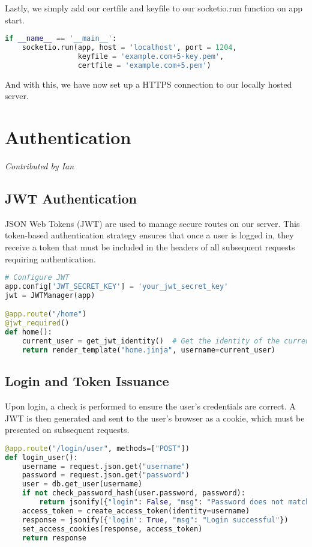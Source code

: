 \documentclass{article}
\begin{document}
Lastly, we simply add our certfile and keyfile to our socketio.run function on app start.
\begin{lstlisting}[language=Python]
if __name__ == '__main__':
    socketio.run(app, host = 'localhost', port = 1204,
                 keyfile = 'example.com+5-key.pem',
                 certfile = 'example.com+5.pem')
\end{lstlisting}

And with this, we have now set up a HTTPS connection to our locally hosted server.

\section{Authentication}
\textit{Contributed by Ian}

\subsection*{JWT Authentication}
JSON Web Tokens (JWT) are used to manage secure routes on our server. This token-based authentication strategy ensures that once a user is logged in, they receive a token that must be included in the headers of all subsequent requests requiring authentication.

\begin{lstlisting}[language=Python]
# Configure JWT
app.config['JWT_SECRET_KEY'] = 'your_jwt_secret_key'
jwt = JWTManager(app) 

@app.route("/home")
@jwt_required()
def home():
    current_user = get_jwt_identity()  # Get the identity of the current user from JWT
    return render_template("home.jinja", username=current_user)
\end{lstlisting}

\subsection*{Login and Token Issuance}
Upon login, a check is performed to ensure the user's credentials are correct. A JWT is then generated and sent to the user's browser as a cookie, which must be presented on subsequent requests.

\begin{lstlisting}[language=Python]
@app.route("/login/user", methods=["POST"])
def login_user():
    username = request.json.get("username")
    password = request.json.get("password")
    user = db.get_user(username)
    if not check_password_hash(user.password, password):
        return jsonify({"login": False, "msg": "Password does not match!"}), 401
    access_token = create_access_token(identity=username)
    response = jsonify({'login': True, "msg": "Login successful"})
    set_access_cookies(response, access_token)
    return response
\end{lstlisting}
\end{document}
